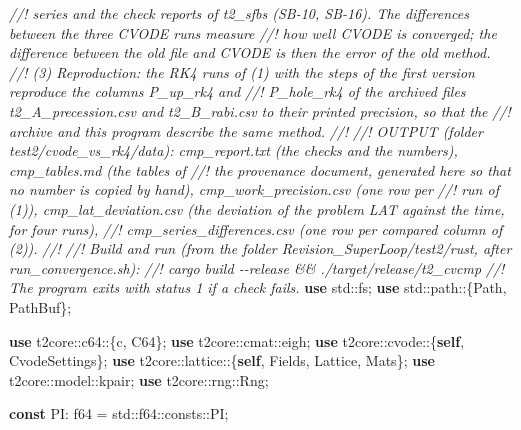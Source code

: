 \documentclass[
  10pt,
]{article}
\newenvironment{Shaded}{}{}
\newcommand{\CommentTok}[1]{\textcolor[rgb]{0.38,0.63,0.69}{\textit{#1}}}
\newcommand{\DataTypeTok}[1]{\textcolor[rgb]{0.56,0.13,0.00}{#1}}
\newcommand{\KeywordTok}[1]{\textcolor[rgb]{0.00,0.44,0.13}{\textbf{#1}}}
\newcommand{\NormalTok}[1]{#1}
\newcommand{\OperatorTok}[1]{\textcolor[rgb]{0.40,0.40,0.40}{#1}}
\newcommand{\PreprocessorTok}[1]{\textcolor[rgb]{0.74,0.48,0.00}{#1}}
\begin{document}
\begin{Shaded}
\begin{Highlighting}[]
\CommentTok{//!       series and the check reports of t2\_sfbs (SB{-}10, SB{-}16).  The differences between the three CVODE runs measure}
\CommentTok{//!       how well CVODE is converged; the difference between the old file and CVODE is then the error of the old method.}
\CommentTok{//!   (3) Reproduction: the RK4 runs of (1) with the steps of the first version reproduce the columns P\_up\_rk4 and}
\CommentTok{//!       P\_hole\_rk4 of the archived files t2\_A\_precession.csv and t2\_B\_rabi.csv to their printed precision, so that the}
\CommentTok{//!       archive and this program describe the same method.}
\CommentTok{//!}
\CommentTok{//! OUTPUT (folder test2/cvode\_vs\_rk4/data): cmp\_report.txt (the checks and the numbers), cmp\_tables.md (the tables of}
\CommentTok{//! the provenance document, generated here so that no number is copied by hand), cmp\_work\_precision.csv (one row per}
\CommentTok{//! run of (1)), cmp\_lat\_deviation.csv (the deviation of the problem LAT against the time, for four runs),}
\CommentTok{//! cmp\_series\_differences.csv (one row per compared column of (2)).}
\CommentTok{//!}
\CommentTok{//! Build and run (from the folder Revision\_SuperLoop/test2/rust, after run\_convergence.sh):}
\CommentTok{//!     cargo build {-}{-}release \&\& ./target/release/t2\_cvcmp}
\CommentTok{//! The program exits with status 1 if a check fails.}
\KeywordTok{use} \PreprocessorTok{std::}\NormalTok{fs}\OperatorTok{;}
\KeywordTok{use} \PreprocessorTok{std::path::}\OperatorTok{\{}\DataTypeTok{Path}\OperatorTok{,} \DataTypeTok{PathBuf}\OperatorTok{\};}

\KeywordTok{use} \PreprocessorTok{t2core::c64::}\OperatorTok{\{}\NormalTok{c}\OperatorTok{,}\NormalTok{ C64}\OperatorTok{\};}
\KeywordTok{use} \PreprocessorTok{t2core::cmat::}\NormalTok{eigh}\OperatorTok{;}
\KeywordTok{use} \PreprocessorTok{t2core::cvode::}\OperatorTok{\{}\KeywordTok{self}\OperatorTok{,}\NormalTok{ CvodeSettings}\OperatorTok{\};}
\KeywordTok{use} \PreprocessorTok{t2core::lattice::}\OperatorTok{\{}\KeywordTok{self}\OperatorTok{,}\NormalTok{ Fields}\OperatorTok{,}\NormalTok{ Lattice}\OperatorTok{,}\NormalTok{ Mats}\OperatorTok{\};}
\KeywordTok{use} \PreprocessorTok{t2core::model::}\NormalTok{kpair}\OperatorTok{;}
\KeywordTok{use} \PreprocessorTok{t2core::rng::}\NormalTok{Rng}\OperatorTok{;}

\KeywordTok{const}\NormalTok{ PI}\OperatorTok{:} \DataTypeTok{f64} \OperatorTok{=} \PreprocessorTok{std::}\DataTypeTok{f64}\PreprocessorTok{::consts::}\NormalTok{PI}\OperatorTok{;}


\end{Highlighting}
\end{Shaded}
\end{document}
